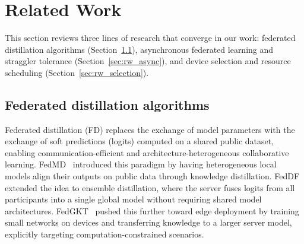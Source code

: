 \documentclass[a4paper,fleqn]{cas-dc}
\begin{document}
	\section{Related Work}\label{sec:related}
	
	This section reviews three lines of research that converge in our work:
	federated distillation algorithms (Section~\ref{sec:rw_fd}),
	asynchronous federated learning and straggler tolerance (Section~\ref{sec:rw_async}),
	and device selection and resource scheduling (Section~\ref{sec:rw_selection}).
	
	\subsection{Federated distillation algorithms}\label{sec:rw_fd}
	
	Federated distillation (FD) replaces the exchange of model parameters
	with the exchange of soft predictions (logits) computed on a shared
	public dataset, enabling communication-efficient and
	architecture-heterogeneous collaborative learning.
	FedMD~\citep{li_fedmd_2019} introduced this paradigm by having
	heterogeneous local models align their outputs on public data through
	knowledge distillation. FedDF~\citep{lin_feddf_2020} extended the idea
	to ensemble distillation, where the server fuses logits from all
	participants into a single global model without requiring shared
	model architectures. FedGKT~\citep{he_fedgkt_2020} pushed this
	further toward edge deployment by training small networks on devices
	and transferring knowledge to a larger server model, explicitly
	targeting computation-constrained scenarios.
	
\end{document}
